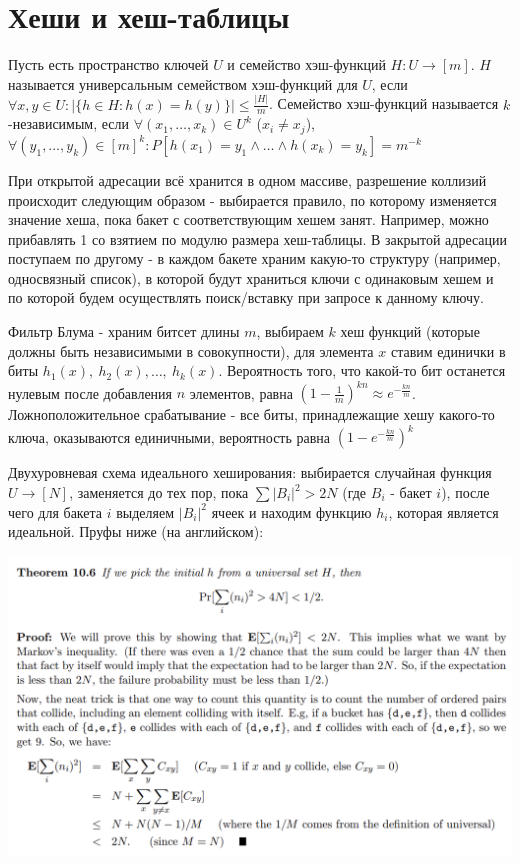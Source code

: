 \section{Хеши и хеш-таблицы}

Пусть есть пространство ключей $U$ и семейство хэш-функций $H : U \to [m]$. $H$ называется универсальным семейством хэш-функций для $U$, если $\forall x, y \in U : |\{h \in H : h(x) = h(y)\}| \leq \frac{|H|}{m}$. Семейство хэш-функций называется $k$-независимым, если $\forall (x_1, \dots, x_k) \in U^k$ ($x_i \neq x_j$), $\forall (y_1, \dots, y_k) \in [m]^k : P[h(x_1) = y_1 \land \dots \land h(x_k) = y_k] = m^{-k}$

При открытой адресации всё хранится в одном массиве, разрешение коллизий происходит следующим образом - выбирается правило, по которому изменяется значение хеша, пока бакет с соответствующим хешем занят. Например, можно прибавлять 1 со взятием по модулю размера хеш-таблицы. В закрытой адресации поступаем по другому - в каждом бакете храним какую-то структуру (например, односвязный список), в которой будут храниться ключи с одинаковым хешем и по которой будем осуществлять поиск/вставку при запросе к данному ключу.

Фильтр Блума - храним битсет длины $m$, выбираем $k$ хеш функций (которые должны быть независимыми в совокупности), для элемента $x$ ставим единички в биты $h_1(x), \ h_2(x), \dots, \ h_k(x)$. Вероятность того, что какой-то бит останется нулевым после добавления $n$ элементов, равна $(1 - \frac{1}{m})^{kn} \approx e^{-\frac{kn}{m}}$. Ложноположительное срабатывание - все биты, принадлежащие хешу какого-то ключа, оказываются единичными, вероятность равна $(1 - e^{-\frac{kn}{m}})^k$

Двухуровневая схема идеального хеширования: выбирается случайная функция $U \to [N]$, заменяется до тех пор, пока $\sum |B_i|^2 > 2N$ (где $B_i$ - бакет $i$), после чего для бакета $i$ выделяем $|B_i|^2$ ячеек и находим функцию $h_i$, которая является идеальной. Пруфы ниже (на английском):

\centering \includegraphics[scale=0.35]{static/perfect_hash_l1.png}

